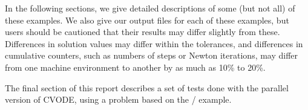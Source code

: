 
\vspace{0.2in}\noindent
In the following sections, we give detailed descriptions of some (but
not all) of these examples.  We also give our output files for
each of these examples, but users should be cautioned that their
results may differ slightly from these.  Differences in solution
values may differ within the tolerances, and differences in cumulative
counters, such as numbers of steps or Newton iterations, may differ
from one machine environment to another by as much as 10\% to 20\%.

The final section of this report describes a set of tests done with the
parallel version of CVODE, using a problem based on the
/ example.

